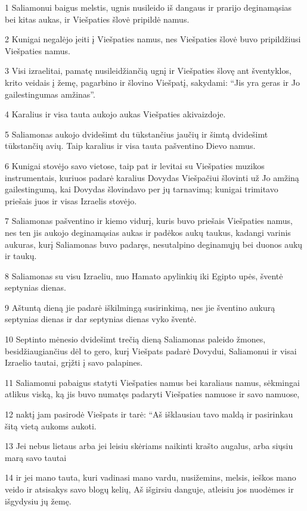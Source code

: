 \par 1 Saliamonui baigus melstis, ugnis nusileido iš dangaus ir prarijo deginamąsias bei kitas aukas, ir Viešpaties šlovė pripildė namus. 
\par 2 Kunigai negalėjo įeiti į Viešpaties namus, nes Viešpaties šlovė buvo pripildžiusi Viešpaties namus. 
\par 3 Visi izraelitai, pamatę nusileidžiančią ugnį ir Viešpaties šlovę ant šventyklos, krito veidais į žemę, pagarbino ir šlovino Viešpatį, sakydami: “Jis yra geras ir Jo gailestingumas amžinas”. 
\par 4 Karalius ir visa tauta aukojo aukas Viešpaties akivaizdoje. 
\par 5 Saliamonas aukojo dvidešimt du tūkstančius jaučių ir šimtą dvidešimt tūkstančių avių. Taip karalius ir visa tauta pašventino Dievo namus. 
\par 6 Kunigai stovėjo savo vietose, taip pat ir levitai su Viešpaties muzikos instrumentais, kuriuos padarė karalius Dovydas Viešpačiui šlovinti už Jo amžiną gailestingumą, kai Dovydas šlovindavo per jų tarnavimą; kunigai trimitavo priešais juos ir visas Izraelis stovėjo. 
\par 7 Saliamonas pašventino ir kiemo vidurį, kuris buvo priešais Viešpaties namus, nes ten jis aukojo deginamąsias aukas ir padėkos aukų taukus, kadangi varinis aukuras, kurį Saliamonas buvo padaręs, nesutalpino deginamųjų bei duonos aukų ir taukų. 
\par 8 Saliamonas su visu Izraeliu, nuo Hamato apylinkių iki Egipto upės, šventė septynias dienas. 
\par 9 Aštuntą dieną jie padarė iškilmingą susirinkimą, nes jie šventino aukurą septynias dienas ir dar septynias dienas vyko šventė. 
\par 10 Septinto mėnesio dvidešimt trečią dieną Saliamonas paleido žmones, besidžiaugiančius dėl to gero, kurį Viešpats padarė Dovydui, Saliamonui ir visai Izraelio tautai, grįžti į savo palapines. 
\par 11 Saliamonui pabaigus statyti Viešpaties namus bei karaliaus namus, sėkmingai atlikus viską, ką jis buvo numatęs padaryti Viešpaties namuose ir savo namuose, 
\par 12 naktį jam pasirodė Viešpats ir tarė: “Aš išklausiau tavo maldą ir pasirinkau šitą vietą aukoms aukoti. 
\par 13 Jei nebus lietaus arba jei leisiu skėriams naikinti krašto augalus, arba siųsiu marą savo tautai 
\par 14 ir jei mano tauta, kuri vadinasi mano vardu, nusižemins, melsis, ieškos mano veido ir atsisakys savo blogų kelių, Aš išgirsiu danguje, atleisiu jos nuodėmes ir išgydysiu jų žemę. 
